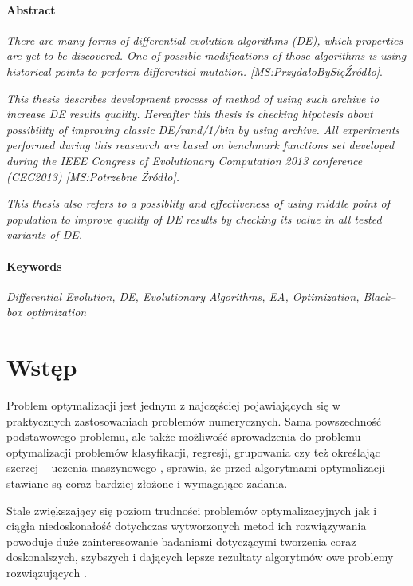 \documentclass[12pt,a4paper]{report}
\begin{document}
\subsubsection{Abstract}
\par{
\emph{There are many forms of differential evolution algorithms (DE), which properties are yet to be discovered. One of possible modifications of those algorithms is using historical points to perform differential mutation. [MS:PrzydałoBySięŹródło]}.
}
\par{
\emph{
This thesis describes development process of method of using such archive to increase DE results quality. Hereafter this thesis is checking hipotesis about possibility of improving classic DE/rand/1/bin by using archive. All experiments performed during this reasearch are based on benchmark functions set developed during the IEEE Congress of Evolutionary Computation 2013 conference (CEC2013) [MS:Potrzebne Źródło].
}
}
\par{
\emph{
This thesis also refers to a possiblity and effectiveness of using middle point of population to improve quality of DE results by checking its value in all tested variants of DE. 
}
}
\subsubsection{Keywords}
\par{
\emph{Differential Evolution, DE, Evolutionary Algorithms, EA, Optimization, Black--box optimization}
}


\chapter{Wstęp}
\par{
Problem optymalizacji jest jednym z najczęściej pojawiających się w praktycznych zastosowaniach problemów numerycznych. Sama powszechność podstawowego problemu, ale także możliwość sprowadzenia do problemu optymalizacji problemów klasyfikacji, regresji, grupowania czy też określając szerzej -- uczenia maszynowego \cite{SpringerIntroToEvol,SearchingInteligent,ArchivedDE}, sprawia, że przed algorytmami optymalizacji stawiane są coraz bardziej złożone i wymagające zadania.
}
\par{
Stale zwiększający się poziom trudności problemów optymalizacyjnych jak i ciągła niedoskonałość dotychczas wytworzonych metod ich rozwiązywania powoduje duże zainteresowanie badaniami dotyczącymi tworzenia coraz doskonalszych, szybszych i dających lepsze rezultaty algorytmów owe problemy rozwiązujących \cite{StateOfArt}.
}
\end{document}
